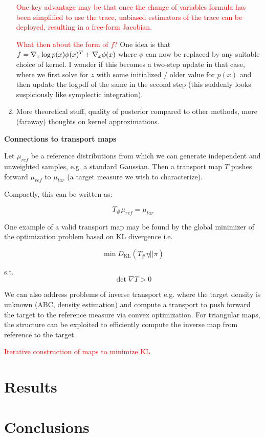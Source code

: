 \documentclass[12pt]{article}
\renewcommand{\[}{\left[}
\renewcommand{\]}{\right]}
\renewcommand{\(}{\left(}
\renewcommand{\)}{\right)}
\newcommand{\grad}[1]{\nabla #1}
\newcommand{\DKL}{D_{\mathrm{KL}}}
\begin{document}
\begin{enumerate}
    \textcolor{red}{One key advantage may be that once the change of variables formula has been simplified to use the trace, unbiased estimators of the trace can be deployed, resulting in a free-form Jacobian.}

    \textcolor{red}{What then about the form of $f$?} One idea is that $f = \grad_x \log p(x) \phi(x)^T + \grad_x \phi(x)$ where $\phi$ can now be replaced by any suitable choice of kernel. I wonder if this becomes a two-step update in that case, where we first solve for $z$ with some initialized / older value for $p(x)$ and then update the logpdf of the same in the second step (this suddenly looks suspiciously like symplectic integration).

    \item More theoretical stuff, quality of posterior compared to other methods, more (faraway) thoughts on kernel approximations.
\end{enumerate}

\noindent \textbf{Connections to transport maps}

Let $\mu_{ref}$ be a reference distributions from which we can generate independent and unweighted samples, e.g. a standard Gaussian. Then a transport map $T$ pushes forward $\mu_{ref}$ to $\mu_{tar}$ (a target measure we wish to characterize). 

Compactly, this can be written as:

$$T_{\#}\mu_{ref} = \mu_{tar}$$

One example of a valid transport map may be found by the global minimizer of the optimization problem based on KL divergence i.e.

$$\min \DKL (T_{\#} \eta || \pi)$$

s.t. $$\det \nabla T > 0$$

We can also address problems of inverse transport e.g. where the target density is unknown (ABC, density estimation) and compute a transport to push forward the target to the reference measure via convex optimization. For triangular maps, the structure can be exploited to efficiently compute the inverse map from reference to the target.

\textcolor{red}{Iterative construction of maps to minimize KL}

\section{Results}

\section{Conclusions}



\end{document}
